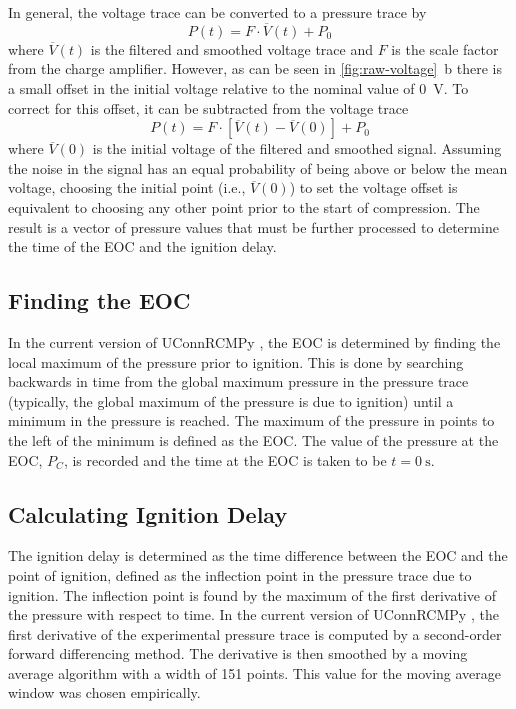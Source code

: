\documentclass[12pt]{../ussci}
\begin{document}
In general, the voltage trace can be converted to a pressure trace by
%
\begin{equation}
    P(t) = F \cdot \overline{V}(t) + P_0
\end{equation}
%
where \(\overline{V}(t)\) is the filtered and smoothed voltage trace and
\(F\) is the scale factor from the charge amplifier. However, as can be
seen in \cref{fig:raw-voltage}~b there is a small offset
in the initial voltage relative to the nominal value of \SI{0}{\V}. To correct
for this offset, it can be subtracted from the voltage trace
%
\begin{equation}
    P(t) = F \cdot \left[\overline{V}(t) - \overline{V}(0)\right] + P_0
\end{equation}
%
where \(\overline{V}(0)\) is the initial voltage of the filtered and
smoothed signal. Assuming the noise in the signal has an equal
probability of being above or below the mean voltage, choosing the
initial point (i.e., \(\overline{V}(0)\)) to set the voltage offset is
equivalent to choosing any other point prior to the start of
compression. The result is a vector of pressure values that must be
further processed to determine the time of the EOC and the ignition
delay.

\subsection{Finding the EOC}\label{finding-the-eoc}

In the current version of UConnRCMPy \autocite{uconnrcmpy}, the EOC is
determined by finding the local maximum of the pressure prior to
ignition. This is done by searching backwards in time from the global
maximum pressure in the pressure trace (typically, the global maximum of
the pressure is due to ignition) until a minimum in the pressure is
reached. The maximum of the pressure in points to the left of the minimum
is defined as the EOC. The value of the pressure at the EOC, \(P_C\), is
recorded and the time at the EOC is taken to be \(t=\SI{0}{\s}\).

\subsection{Calculating Ignition Delay}\label{calculating-ignition-delay}

The ignition delay is determined as the time difference between the EOC
and the point of ignition, defined as the inflection point in the pressure
trace due to ignition. The inflection point is found by the maximum
of the first derivative of the pressure with respect to time.
In the current version of UConnRCMPy \autocite{uconnrcmpy}, the first
derivative of the experimental pressure trace is computed by a
second-order forward differencing method. The derivative is then
smoothed by a moving average algorithm with a width of 151 points.
This value for the moving average window was chosen empirically.
\end{document}
